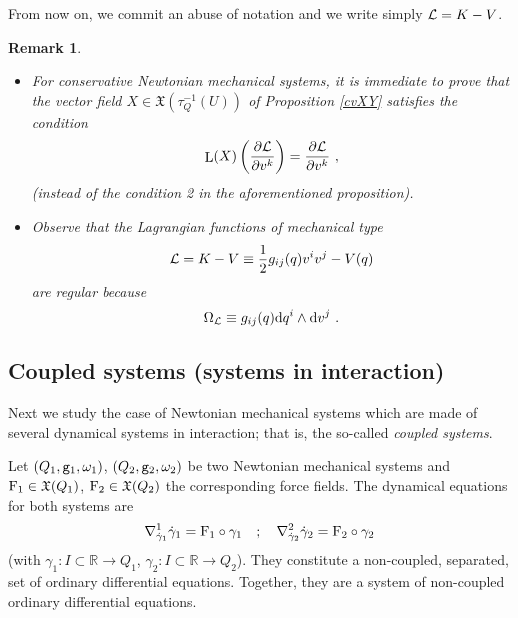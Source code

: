 \documentclass[12pt]{report}
\newtheorem{remark}[teor]{Remark}
\def\beq{\begin{equation}}
\def\eeq{\end{equation}}
\def\bit{\begin{itemize}}
\def\eit{\end{itemize}}
\def\derpar#1#2{\frac{\partial{#1}}{\partial{#2}}}
\def\vf{\mathfrak X}
\def\Lag{{\cal L}}
\def\d{{\rm d}}
\def\Real{\mathbb{R}}
\def\Lie{\mathop{\rm L}\nolimits}
\begin{document}
From now on, we commit an abuse of notation and we write simply $\Lag=K-V$.

\bigskip
\begin{remark}{\rm 
\bit
\item
For conservative Newtonian mechanical systems, it is immediate to prove that the vector field  $X\in\vf(\tau_Q^{-1}(U))$ of Proposition \ref{cvXY}
satisfies the condition
$$
\Lie(X)\left(\derpar{\Lag}{v^k}\right) =
\derpar{\Lag}{v^k} \ ,
$$
(instead of the condition 2 in the aforementioned proposition).
\item
Observe that  the Lagrangian functions {\sl of mechanical type}
$$
 \Lag =K-V \equiv \frac{1}{2}g_{ij}(q)v^iv^j-V(q)
$$
are regular because
$$
\Omega_\Lag \equiv g_{ij}(q)\d q^i\wedge\d v^j \ .
$$
\eit
}\end{remark}


\subsection{Coupled systems (systems in  interaction)}
\protect\label{sdni}


Next we study the case of Newtonian mechanical systems which are
made of several dynamical systems in interaction; that is,
the so-called {\sl coupled systems}.


Let $(Q_1,{\tt g}_1,\omega_1)$, $(Q_2,{\tt g}_2,\omega_2)$ be two Newtonian mechanical systems and ${\rm F}_1\in\vf (Q_1)$, ${\rm F}_2\in\vf (Q_2)$ the corresponding force fields. The dynamical equations for both systems are
\beq
\nabla^1_{\dot\gamma_1}\dot\gamma_1={\rm F}_1\circ\gamma_1
\quad ; \quad
\nabla^2_{\dot\gamma_2}\dot\gamma_2={\rm F}_2\circ\gamma_2
\label{eqsisdes}
\eeq
(with $\gamma_1\colon I\subset\Real\to Q_1$, $\gamma_2\colon I\subset\Real\to Q_2$). 
They constitute a non-coupled, separated, set of ordinary differential equations. 
Together, they are a system of  non-coupled ordinary differential equations.
\end{document}
